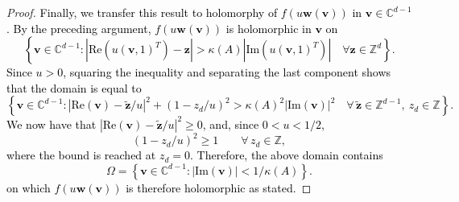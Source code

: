 \documentclass[10pt,a4paper]{amsart}
\renewcommand{\Im}[1]{\mathrm{Im}(#1)}
\renewcommand{\Re}[1]{\mathrm{Re}(#1)}
\newcommand{\new}[1]{{\textcolor{black}{#1}}}
\begin{document}
\begin{proof}
\new{Finally, we transfer this result to holomorphy of $f(u\bm w(\bm v))$ in $\bm v\in\mathds C^{d-1}$. By the preceding argument, $f(u\bm w(\bm v))$ is holomorphic in $\bm v$ on
\[
\left\{
\bm v\in\mathds C^{d-1}:
\left|\Re{u(\bm v,1)^T}-\bm z\right|
>
\kappa(A)\left|\Im{u(\bm v,1)^T}\right|
\quad \forall \bm z\in\mathds Z^d
\right\}.
\]
Since $u>0$, squaring the inequality and separating the last component shows that the domain is equal to
\[
\left\{
\bm v\in\mathds C^{d-1}:
\left|\Re{\bm v}-\tilde{\bm z}/u\right|^2
+
\left(1-z_d/u\right)^2
>
\kappa(A)^2 |\Im{\bm v}|^2
\quad
\forall\, \tilde{\bm z}\in\mathds Z^{d-1},\ z_d\in\mathds Z
\right\}.
\]
We now have that $\left|\Re{\bm v}-\tilde{\bm z}/{u}\right|^2 \ge 0$,
and, since $0<u<1/2$,
\[
\left(1-z_d/u\right)^2 \ge 1
\qquad \forall\, z_d\in\mathds Z,
\]
where the bound is reached at $z_d=0$.
Therefore, the above domain contains
\[
\Omega=\left\{
\bm v\in\mathds C^{d-1}:
|\Im{\bm v}|<1/\kappa(A)
\right\}.
\]
on which $f(u\bm w(\bm v))$ is therefore holomorphic as stated.}
\end{proof}
\end{document}
